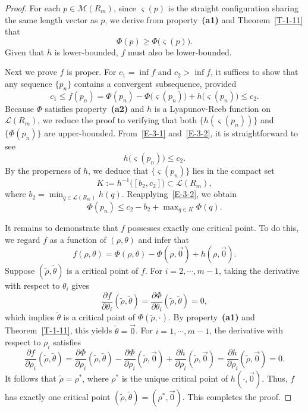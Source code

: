 \documentclass[11pt,letterpaper]{amsart}
\theoremstyle{plain}
\theoremstyle{definition}
\theoremstyle{remark}
\numberwithin{equation}{section}
\begin{document}
\begin{proof}
For each $p\in \mathcal M(R_m)$, since $\varsigma(p)$ is the straight configuration sharing the same length vector as $p$, we derive from
property~\textbf{(a1)} and Theorem~\ref{T-1-11} that
\begin{equation}\label{E-3-1}
\Phi(p)\geq \Phi\big(\varsigma(p)\big).
\end{equation}
Given that $h$ is lower-bounded,  $f$ must also be lower-bounded.

Next we prove $f$ is proper. For $c_1=\inf f$ and $c_2>\inf f$, it suffices to show that any sequence $\{p_n\}$ contains a convergent subsequence, provided
\begin{equation}\label{E-3-2}
c_1\leq f(p_n)=\Phi(p_n)-\Phi\big(\varsigma(p_n)\big)
+h\big(\varsigma(p_n)\big)\leq c_2.
\end{equation}
Because $\Phi$ satisfies property~\textbf{(a2)} and $h$ is a Lyapunov-Reeb function on $\mathcal L(R_m)$, we reduce the proof to verifying that both $\big\{h(\varsigma(p_n))\big\}$ and $\big\{\Phi(p_n)\big\}$ are upper-bounded. From~\eqref{E-3-1} and~\eqref{E-3-2}, it is straightforward to see
\[
h\big(\varsigma(p_n)\big)\leq c_2.
\]
By the properness of $h$, we deduce that $\big\{\varsigma(p_n)\big\}$ lies in the compact set
\[
K:=h^{-1}\big([b_2,c_2]\big)\subset \mathcal L(R_m),
\]
where $b_2=\min_{q\in \mathcal L(R_m)} h(q)$. Reapplying~\eqref{E-3-2}, we obtain
\[
\Phi(p_n)\leq c_2-b_2+\max\nolimits_{q\in K}\Phi(q).
\]

It remains to demonstrate that  $f$ possesses exactly one critical point. To do this, we regard $f$ as a function of $(\rho,\theta)$ and infer that
\[
f(\rho,\theta)=\Phi(\rho,\theta)-\Phi(\rho,\vec{0})+h(\rho,\vec{0}).
\]
Suppose $(\tilde{\rho},\tilde{\theta})$ is a critical point of $f$. For $i=2,\cdots,m-1$, taking the derivative with respect to $\theta_i$ gives
\[
\frac{\partial f}{\partial \theta_i}(\tilde{\rho},\tilde{\theta})=\frac{\partial \Phi}{\partial \theta_i}(\tilde{\rho},\tilde{\theta})=0,
\]
which implies $\tilde{\theta}$ is a critical point of  $\Phi(\tilde{\rho},\cdot)$. By property~\textbf{(a1)} and Theorem~\ref{T-1-11}, this yields $\tilde{\theta}=\vec{0}$. For $i=1,\cdots,m-1$, the derivative with respect to $\rho_i$ satisfies
\[
\frac{\partial f}{\partial \rho_i}(\tilde{\rho},\tilde{\theta})=\frac{\partial \Phi}{\partial \rho_i}(\tilde{\rho},\tilde{\theta})-\frac{\partial \Phi}{\partial \rho_i}(\tilde{\rho},\vec{0})+\frac{\partial h}{\partial \rho_i}(\tilde{\rho},\vec{0})=\frac{\partial h}{\partial \rho_i}(\tilde{\rho},\vec{0})=0.
\]
It follows that $\tilde{\rho}=\rho^\ast$, where $\rho^\ast$ is the unique critical point of $h(\cdot,\vec{0})$. Thus, $f$ has exactly one critical point $(\tilde{\rho},\tilde{\theta})=(\rho^\ast,\vec{0})$. This completes the proof.
\end{proof}
\end{document}
